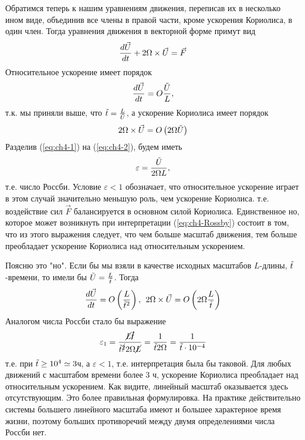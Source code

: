 Обратимся теперь к нашим уравнениям движения, переписав их в несколько ином виде, объединив все члены в правой части, кроме ускорения Кориолиса, в один член. Тогда уравнения движения в векторной форме примут вид
\[
    \displaystyle\frac{d \vec{U}}{d t}+2\Omega\times\vec{U}=\vec{F}
\]
Относительное ускорение имеет порядок 
\begin{equation}
\label{eq:ch4-1}
    \displaystyle\frac{d \vec{U}}{d t}=O\frac{\Tilde{U}}{L},
\end{equation}
т.к. мы приняли выше, что $\Tilde{t}=\frac{L}{\Tilde{U}}$, а ускорение Кориолиса имеет порядок
\begin{equation}
    \label{eq:ch4-2}
    2\Omega\times\vec{U}=O\left(2 \Omega \Tilde{U}\right)
\end{equation}
Разделив (\ref{eq:ch4-1}) на (\ref{eq:ch4-2}), будем иметь
\begin{equation}
    \label{eq:ch4-Rossby}
    \varepsilon=\frac{\Tilde{U}}{2\Omega L},
\end{equation}
т.е. число Россби. Условие $\varepsilon<1$ обозначает, что относительное ускорение играет в этом случай значительно меньшую роль, чем ускорение Кориолиса. т.е. воздействие сил $\vec{F}$ балансируется в основном силой Кориолиса. Единственное но, которое может возникнуть при интерпретации (\ref{eq:ch4-Rossby}) состоит в том, что из этого выражения следует, что чем больше масштаб движения, тем больше преобладает ускорение Кориолиса над относительным ускорением.

Поясню это "но". Если бы мы взяли в качестве исходных масштабов $L$-длины, $\Tilde{t}$-времени, то имели бы $\Tilde{U}=\frac{L}{\Tilde{t}}$.  Тогда
\[
\displaystyle\frac{d \vec{U}}{d t}=O\left(\frac{L}{\Tilde{t}^2}\right), \:\: 2\Omega\times\vec{U}=O\left( 2\Omega\frac{L}{\Tilde{t}}\right)
\]
Аналогом числа Россби стало бы выражение 
\[
\varepsilon_1=\frac{\cancel{L} \cancel{\Tilde{t}}}{\Tilde{t}^{\cancel{2}} 2 \Omega \cancel{L} }=\frac{1}{\Tilde{t} 2 \Omega}=\frac{1}{\Tilde{t}\cdot 10^{-4}}
\]
т.е. при $\Tilde{t}\geq 10^4\simeq3$ч, а $\varepsilon<1$, т.е. интерпретация была бы таковой. Для любых движений с масштабом времени более 3 ч, ускорение Кориолиса преобладает над относительным ускорением. Как видите, линейный масштаб оказывается здесь отсутствующим. Это более правильная формулировка. На практике действительно системы большего линейного масштаба имеют и большее характерное время жизни, поэтому больших противоречий между двумя определениями числа Россби нет. 

